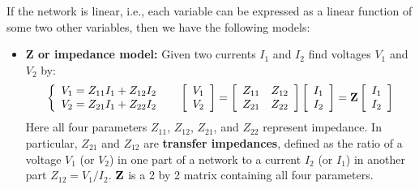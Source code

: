 \begin{itemize}
\begin{comment}
{\bf Note: } All voltages and currents below are complex variables and
represented by phasors containing both magnitude and phase angle. However, 
for convenience the phasor notation $\dot{V}$ and $\dot{I}$ are replaced by 
$V$ and $I$ respectively.
\end{comment}


If the network is linear, i.e., each variable can be expressed as a linear
function of some two other variables, then we have the following models:

\begin{itemize}
\item {\bf Z or impedance model:} Given two currents $I_1$ and $I_2$ 
  find voltages $V_1$ and $V_2$ by:
  \[ \left\{ \begin{array}{l} V_1=Z_{11}I_1+Z_{12}I_2 \\
    V_2=Z_{21}I_1+Z_{22}I_2 \end{array} \right.\;\;\;\;\;
  \left[ \begin{array}{l} V_1 \\ V_2\end{array} \right]=
  \left[ \begin{array}{ll} Z_{11} & Z_{12}\\Z_{21} & Z_{22}\end{array}\right]
  \left[ \begin{array}{l} I_1 \\ I_2\end{array} \right]
  ={\bf Z}\left[ \begin{array}{l} I_1 \\ I_2\end{array} \right] \]
  Here all four parameters $Z_{11}$, $Z_{12}$, $Z_{21}$, and $Z_{22}$ represent
  impedance. In particular, $Z_{21}$ and $Z_{12}$ are {\bf transfer impedances}, 
  defined as the ratio of a voltage $V_1$ (or $V_2$) in one part of a network to 
  a current $I_2$ (or $I_1$) in another part $Z_{12}=V_1/I_2$. ${\bf Z}$ is a 2 
  by 2 matrix containing all four parameters.


\end{itemize}
\end{itemize}
